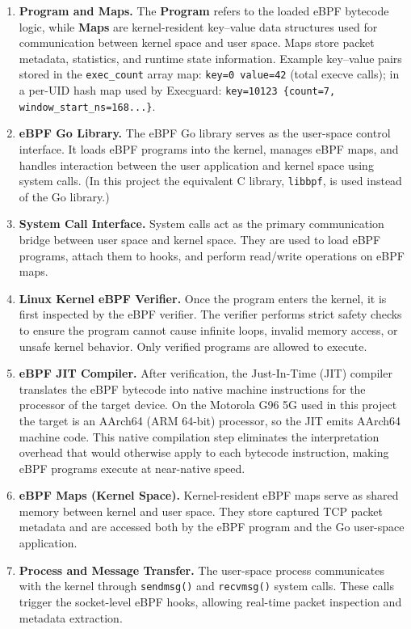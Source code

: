 \documentclass{mnitjaipur}
\begin{document}
\begin{enumerate}
\item \textbf{Program and Maps.}
The \textbf{Program} refers to the loaded eBPF bytecode logic, while \textbf{Maps} are kernel-resident key--value data structures used for communication between kernel space and user space. Maps store packet metadata, statistics, and runtime state information. Example key--value pairs stored in the \texttt{exec\_count} array map: \texttt{key=0 \textrightarrow{} value=42} (total execve calls); in a per-UID hash map used by Execguard: \texttt{key=10123 \textrightarrow{} \{count=7, window\_start\_ns=168...\}}.

\item \textbf{eBPF Go Library.}
The eBPF Go library serves as the user-space control interface. It loads eBPF programs into the kernel, manages eBPF maps, and handles interaction between the user application and kernel space using system calls. (In this project the equivalent C library, \texttt{libbpf}, is used instead of the Go library.)

\item \textbf{System Call Interface.}
System calls act as the primary communication bridge between user space and kernel space. They are used to load eBPF programs, attach them to hooks, and perform read/write operations on eBPF maps.

\item \textbf{Linux Kernel eBPF Verifier.}
Once the program enters the kernel, it is first inspected by the eBPF verifier. The verifier performs strict safety checks to ensure the program cannot cause infinite loops, invalid memory access, or unsafe kernel behavior. Only verified programs are allowed to execute.

\item \textbf{eBPF JIT Compiler.}
After verification, the Just-In-Time (JIT) compiler translates the eBPF bytecode into native machine instructions for the processor of the target device. On the Motorola G96 5G used in this project the target is an AArch64 (ARM 64-bit) processor, so the JIT emits AArch64 machine code. This native compilation step eliminates the interpretation overhead that would otherwise apply to each bytecode instruction, making eBPF programs execute at near-native speed.

\item \textbf{eBPF Maps (Kernel Space).}
Kernel-resident eBPF maps serve as shared memory between kernel and user space. They store captured TCP packet metadata and are accessed both by the eBPF program and the Go user-space application.

\item \textbf{Process and Message Transfer.}
The user-space process communicates with the kernel through \texttt{sendmsg()} and \texttt{recvmsg()} system calls. These calls trigger the socket-level eBPF hooks, allowing real-time packet inspection and metadata extraction.

\end{enumerate}
\end{document}
